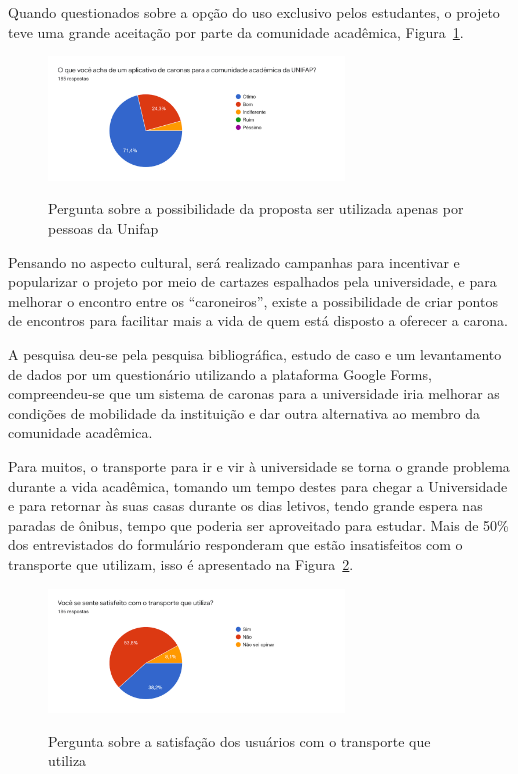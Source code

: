 Quando questionados sobre a opção do uso exclusivo pelos estudantes, o projeto teve uma grande aceitação por parte da comunidade acadêmica, Figura~\ref{fig:aceitacao}. 

\begin{figure}[!hbtp]
	\centering
	\caption{Pergunta sobre a possibilidade da proposta ser utilizada apenas por pessoas da Unifap}
	\includegraphics[width=0.7\textwidth]{./04-figuras/questionario/5.png}
	\label{fig:aceitacao}
\end{figure}

Pensando no aspecto cultural, será realizado campanhas para incentivar e popularizar o projeto por meio de cartazes espalhados pela universidade, e para melhorar o encontro entre os “caroneiros”, existe a possibilidade de criar pontos de encontros para facilitar mais a vida de quem está disposto a oferecer a carona.

A pesquisa deu-se pela pesquisa bibliográfica, estudo de caso e um levantamento de dados por um questionário utilizando a plataforma Google Forms, compreendeu-se que um sistema de caronas para a universidade iria melhorar as condições de mobilidade da instituição e dar outra alternativa ao membro da comunidade acadêmica.

Para muitos, o transporte para ir e vir à universidade se torna o grande problema durante a vida acadêmica, tomando um tempo destes para chegar a Universidade e para retornar às suas casas durante os dias letivos, tendo grande espera nas paradas de ônibus, tempo que poderia ser aproveitado para estudar. Mais de 50\% dos entrevistados do formulário responderam que estão insatisfeitos com o transporte que utilizam, isso é apresentado na Figura~\ref{fig:satisfacao}.

\begin{figure}[!hbtp]
	\centering
	\caption{Pergunta sobre a satisfação dos usuários com o transporte que utiliza}
	\includegraphics[width=0.7\textwidth]{./04-figuras/questionario/6.png}
	\label{fig:satisfacao}
\end{figure}

